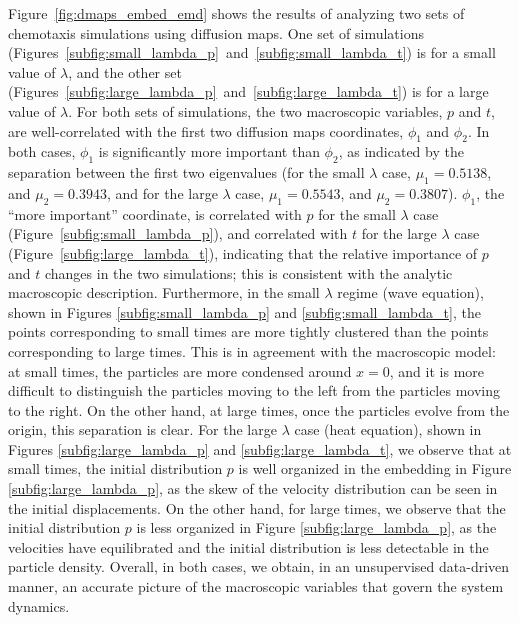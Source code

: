 \documentclass[prl, reprint]{revtex4-1}
\begin{document}
Figure~\ref{fig:dmaps_embed_emd} shows the results of analyzing two sets of chemotaxis simulations using diffusion maps. 
%
One set of simulations (Figures~\ref{subfig:small_lambda_p}~and~\ref{subfig:small_lambda_t}) is for a small value of $\lambda$, and the other set (Figures~\ref{subfig:large_lambda_p}~and~\ref{subfig:large_lambda_t}) is for a large value of $\lambda$. 
%
For both sets of simulations, the two macroscopic variables, $p$ and $t$, are well-correlated with the first two diffusion maps coordinates, $\phi_1$ and $\phi_2$. 
%
In both cases, $\phi_1$ is significantly more important than $\phi_2$, as indicated by the separation between the first two eigenvalues (for the small $\lambda$ case, $\mu_1 = 0.5138$, and $\mu_2 = 0.3943$, and for the large $\lambda$ case, $\mu_1 = 0.5543$, and $\mu_2 = 0.3807$).
%
$\phi_1$, the ``more important'' coordinate, is correlated with $p$ for the small $\lambda$ case (Figure~\ref{subfig:small_lambda_p}), and correlated with $t$ for the large $\lambda$ case (Figure~\ref{subfig:large_lambda_t}), indicating that the relative importance of $p$ and $t$ changes in the two simulations;
this is consistent with the analytic macroscopic description. 
%
Furthermore, in the small $\lambda$ regime (wave equation), shown in Figures \ref{subfig:small_lambda_p} and \ref{subfig:small_lambda_t}, the points corresponding to small times are more tightly clustered than the points corresponding to large times.
%
This is in agreement with the macroscopic model: at small times, the particles are more condensed around $x=0$, and it is more difficult to distinguish the particles moving to the left from the particles moving to the right. 
%
On the other hand, at large times, once the particles evolve from the origin, this separation is clear.  
%
For the large $\lambda$ case (heat equation), shown in Figures \ref{subfig:large_lambda_p} and \ref{subfig:large_lambda_t}, we observe that at small times, the initial distribution $p$ is well organized in the embedding in Figure \ref{subfig:large_lambda_p}, as the skew of the velocity distribution can be seen in the initial displacements.
%
On the other hand, for large times, we observe that the initial distribution $p$ is less organized in Figure \ref{subfig:large_lambda_p}, as the velocities have equilibrated and the initial distribution is less detectable in the particle density.
%
Overall, in both cases, we obtain, in an unsupervised data-driven manner, an accurate picture of the macroscopic variables that govern the system dynamics.

\end{document}

